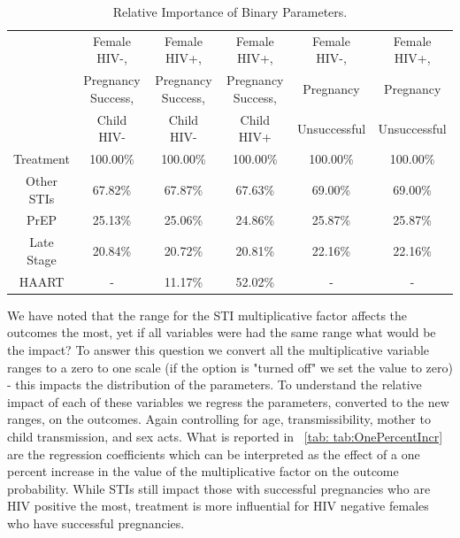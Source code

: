 \documentclass[11pt]{nih_mod}
\begin{document}
\begin{table}	
\begin{center}
\begin{tabular}{|c|c|c|c|c|c|}
\hline
 & Female HIV-,  & Female HIV+, & Female HIV+, & Female HIV-, & Female HIV+,\\ 
 & Pregnancy Success,& Pregnancy Success,&Pregnancy Success,& Pregnancy& Pregnancy\\ 
 & Child HIV-&Child HIV-&Child HIV+&Unsuccessful&Unsuccessful\\ 
\hline
\hline
Treatment & 100.00\% & 100.00\% & 100.00\% & 100.00\% & 100.00\%\\ 
Other STIs & 67.82\% & 67.87\% & 67.63\% & 69.00\% & 69.00\%\\ 
PrEP & 25.13\% & 25.06\% & 24.86\% & 25.87\% & 25.87\%\\ 
Late Stage & 20.84\% & 20.72\% & 20.81\% & 22.16\% & 22.16\%\\ 
HAART & - & 11.17\% & 52.02\% & - & -\\
\hline
\end{tabular}
	\caption{Relative Importance of Binary Parameters. \label{tab:binaryImp}}
\end{center}
\end{table}

We have noted that the range for the STI multiplicative factor affects the outcomes the most, yet if all variables were had the same range what would be the impact?  To answer this question we convert all the multiplicative variable ranges to a zero to one scale (if the option is "turned off" we set the value to zero) - this impacts the distribution of the parameters.  To understand the relative impact of each of these variables we regress the parameters, converted to the new ranges, on the outcomes.  Again controlling for age, transmissibility, mother to child transmission, and sex acts.  What is reported in ~\ref{tab: tab:OnePercentIncr} are the regression coefficients which can be interpreted as the effect of a one percent increase in the value of the multiplicative factor on the outcome probability.  While STIs still impact those with successful pregnancies who are HIV positive the most, treatment is more influential for HIV negative females who have successful pregnancies.
\end{document}
